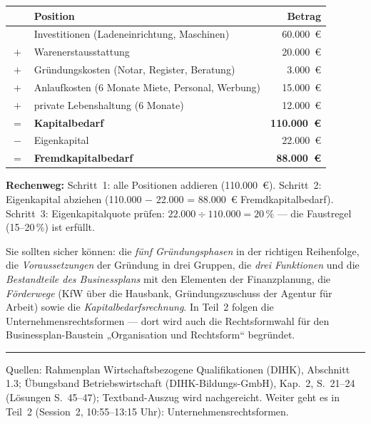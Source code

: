 \documentclass[11pt, a4paper]{article}
\begin{document}
\begin{beispiel}[title={\bfseries Zahlenbeispiel: Kapitalbedarf einer Ladengründung}]
\begin{center}
\begin{tabular}{clr}
\toprule
 & \textbf{Position} & \textbf{Betrag}\\
\midrule
 & Investitionen (Ladeneinrichtung, Maschinen) & 60.000~€\\
$+$ & Warenerstausstattung & 20.000~€\\
$+$ & Gründungskosten (Notar, Register, Beratung) & 3.000~€\\
$+$ & Anlaufkosten (6 Monate Miete, Personal, Werbung) & 15.000~€\\
$+$ & private Lebenshaltung (6 Monate) & 12.000~€\\
\midrule
$=$ & \textbf{Kapitalbedarf} & \textbf{110.000~€}\\
$-$ & Eigenkapital & 22.000~€\\
\midrule
$=$ & \textbf{Fremdkapitalbedarf} & \textbf{88.000~€}\\
\bottomrule
\end{tabular}
\end{center}
\textbf{Rechenweg:} Schritt~1: alle Positionen addieren (110.000~€).
Schritt~2: Eigenkapital abziehen (110.000 $-$ 22.000 = 88.000~€ Fremdkapitalbedarf).
Schritt~3: Eigenkapitalquote prüfen: $22.000 \div 110.000 = 20\,\%$ ---
die Faustregel (15--20\,\%) ist erfüllt.
\end{beispiel}

\begin{merksatz}[title={\bfseries Wichtig für die Prüfungsvorbereitung (Teil 1)}]
Sie sollten sicher können: die \emph{fünf Gründungsphasen} in der richtigen Reihenfolge,
die \emph{Voraussetzungen} der Gründung in drei Gruppen, die \emph{drei Funktionen} und
die \emph{Bestandteile des Businessplans} mit den Elementen der Finanzplanung, die
\emph{Förderwege} (KfW über die Hausbank, Gründungszuschuss der Agentur für Arbeit)
sowie die \emph{Kapitalbedarfsrechnung}. In Teil~2 folgen die Unternehmensrechtsformen
--- dort wird auch die Rechtsformwahl für den Businessplan-Baustein „Organisation und
Rechtsform`` begründet.
\end{merksatz}

\vspace{1em}
\hrule
\vspace{0.8em}
\noindent\textsf{\small Quellen: Rahmenplan Wirtschaftsbezogene Qualifikationen (DIHK), Abschnitt 1.3;
Übungsband Betriebswirtschaft (DIHK-Bildungs-GmbH), Kap.~2, S.~21--24 (Lösungen S.~45--47);
Textband-Auszug wird nachgereicht. Weiter geht es in Teil~2 (Session~2, 10:55--13:15 Uhr):
Unternehmensrechtsformen.}
\end{document}
